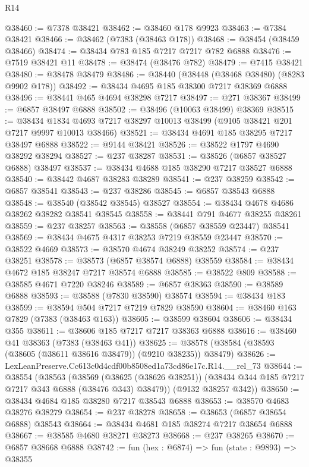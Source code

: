 \begin{lexlean}{R14}
\begin{coremodule}
@38460 := @7378 @38421
@38462 := @38460 @178 @9923
@38463 := @7384 @38421
@38466 := @38462 (@7383 (@38463 @178))
@38468 := @38454 (@38459 @38466)
@38474 := @38434 @783 @185 @7217 @7217 @782 @6888
@38476 := @7519 @38421 @11
@38478 := @38474 (@38476 @782)
@38479 := @7415 @38421
@38480 := @38478 @38479
@38486 := @38440 (@38448 (@38468 @38480) (@8283 @9902 @178))
@38492 := @38434 @4695 @185 @38300 @7217 @38369 @6888
@38496 := @38441 @465 @4694 @38298 @7217
@38497 := @271 @38367
@38499 := @6857 @38497 @6888
@38502 := @38496 (@10063 @38499) @38369
@38515 := @38434
    @1834
    @4693
    @7217
    @38297
    @10013
    @38499
    (@9105 @38421 @201 @7217 @9997 @10013 @38466)
@38521 := @38434 @4691 @185 @38295 @7217 @38497 @6888
@38522 := @9144 @38421
@38526 := @38522 @1797 @4690 @38292 @38294
@38527 := @237 @38287
@38531 := @38526 (@6857 @38527 @6888) @38497
@38537 := @38434 @4688 @185 @38290 @7217 @38527 @6888
@38540 := @38442 @4687 @38283 @38289
@38541 := @237 @38259
@38542 := @6857 @38541
@38543 := @237 @38286
@38545 := @6857 @38543 @6888
@38548 := @38540 (@38542 @38545) @38527
@38554 := @38434 @4678 @4686 @38262 @38282 @38541 @38545
@38558 := @38441 @791 @4677 @38255 @38261
@38559 := @237 @38257
@38563 := @38558 (@6857 @38559 @23447) @38541
@38569 := @38434 @4675 @4317 @38253 @7219 @38559 @23447
@38570 := @38522 @4669
@38573 := @38570 @4674 @38249 @38252
@38574 := @237 @38251
@38578 := @38573 (@6857 @38574 @6888) @38559
@38584 := @38434 @4672 @185 @38247 @7217 @38574 @6888
@38585 := @38522 @809
@38588 := @38585 @4671 @7220 @38246
@38589 := @6857 @38363
@38590 := @38589 @6888
@38593 := @38588 (@7830 @38590) @38574
@38594 := @38434 @183
@38599 := @38594 @504 @7217 @7219 @7829 @38590
@38604 := @38460 @163 @7829 (@7383 (@38463 @163))
@38605 := @38599 @38604
@38606 := @38434 @355
@38611 := @38606 @185 @7217 @7217 @38363 @6888
@38616 := @38460 @41 @38363 (@7383 (@38463 @41))
@38625 := @38578 (@38584 (@38593 (@38605 (@38611 @38616 @38479)) (@9210 @38235)) @38479)
@38626 := LexLeanPreserve.Cc613c0d4cdf00b8508ed1a73cd86e17c.R14.__rel_73
@38644 := @38554
    (@38563
      (@38569
        (@38625 (@38626 @38251))
        (@38434 @344 @185 @7217 @7217 @343 @6888 (@38476 @343) @38479))
      (@9132 @38257 @342))
@38650 := @38434 @4684 @185 @38280 @7217 @38543 @6888
@38653 := @38570 @4683 @38276 @38279
@38654 := @237 @38278
@38658 := @38653 (@6857 @38654 @6888) @38543
@38664 := @38434 @4681 @185 @38274 @7217 @38654 @6888
@38667 := @38585 @4680 @38271 @38273
@38668 := @237 @38265
@38670 := @6857 @38668 @6888
@38742 := fun (hex : @6874) =>
  fun (state : @9893) =>
  @38355

\end{coremodule}
\end{lexlean}
